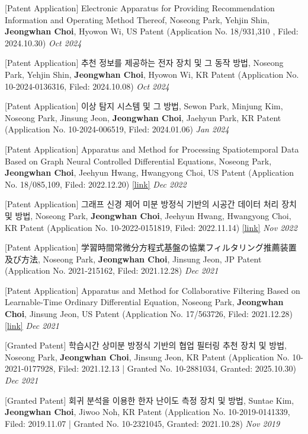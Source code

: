 \documentclass[10pt]{article}
\newenvironment{changemargin}[2]{
  \begin{list}{}{
    \setlength{\topsep}{0pt}
    \setlength{\leftmargin}{#1}
    \setlength{\rightmargin}{#2}
    \setlength{\listparindent}{\parindent}
    \setlength{\itemindent}{\parindent}
    \setlength{\parsep}{\parskip}
  }
  \item[]}{\end{list}
}
\newcommand{\presentation}[2]{
	{#1} \hfill \emph{#2}\\ \bigskip
}
\newenvironment{body} {
	\vspace*{-16pt}
	\begin{changemargin}{-0.25in}{-0.5in}
  }
	{\end{changemargin}
}
\begin{document}
\begin{body}
	\vspace{14pt}

\presentation{[Patent Application] Electronic Apparatus for Providing Recommendation Information and Operating Method Thereof, Noseong Park, Yehjin Shin, \textbf{Jeongwhan Choi}, Hyowon Wi, US Patent (Application No. 18/931,310 , Filed: 2024.10.30)}{Oct 2024}	
	
\presentation{[Patent Application] 추천 정보를 제공하는 전자 장치 및 그 동작 방법, Noseong Park, Yehjin Shin, \textbf{Jeongwhan Choi}, Hyowon Wi, KR Patent (Application No. 10-2024-0136316, Filed: 2024.10.08)}{Oct 2024}	


\presentation{[Patent Application] 이상 탐지 시스템 및 그 방법, Sewon Park, Minjung Kim, Noseong Park, Jinsung Jeon, \textbf{Jeongwhan Choi}, Jaehyun Park, KR Patent (Application No. 10-2024-006519, Filed: 2024.01.06) }{Jan 2024}

\presentation{[Patent Application] Apparatus and Method for Processing Spatiotemporal Data Based on Graph Neural Controlled Differential Equations, Noseong Park, \textbf{Jeongwhan Choi}, Jeehyun Hwang, Hwangyong Choi, US Patent (Application No. 18/085,109, Filed: 2022.12.20) \href{https://patents.google.com/patent/US20230186105A1/en}{[link]}}{Dec 2022}	

\presentation{[Patent Application] 그래프 신경 제어 미분 방정식 기반의 시공간 데이터 처리 장치 및 방법, Noseong Park, \textbf{Jeongwhan Choi}, Jeehyun Hwang, Hwangyong Choi, KR Patent (Application No. 10-2022-0151819, Filed: 2022.11.14) \href{https://patents.google.com/patent/KR20240073179A/en}{[link]}}{Nov 2022}

\presentation{[Patent Application] 学習時間常微分方程式基盤の協業フィルタリング推薦装置及び方法, Noseong Park, \textbf{Jeongwhan Choi}, Jinsung Jeon, JP Patent (Application No. 2021-215162, Filed: 2021.12.28)}{Dec 2021}	

\presentation{[Patent Application] Apparatus and Method for Collaborative Filtering Based on Learnable-Time Ordinary Differential Equation, Noseong Park, \textbf{Jeongwhan Choi}, Jinsung Jeon, US Patent (Application No. 17/563726, Filed: 2021.12.28) \href{https://patents.google.com/patent/US20230186105A1/en}{[link]}}{Dec 2021}	

\presentation{[Granted Patent] 학습시간 상미분 방정식 기반의 협업 필터링 추천 장치 및 방법, Noseong Park, \textbf{Jeongwhan Choi}, Jinsung Jeon, KR Patent (Application No. 10-2021-0177928, Filed: 2021.12.13 | Granted No. 10-2881034, Granted: 2025.10.30)}{Dec 2021}

\presentation{[Granted Patent] 회귀 분석을 이용한 한자 난이도 측정 장치 및 방법, Suntae Kim, \textbf{Jeongwhan Choi}, Jiwoo Noh, KR Patent (Application No. 10-2019-0141339, Filed: 2019.11.07 | Granted No. 10-2321045, Granted: 2021.10.28) }{Nov 2019}	
\end{body}
    
\end{document}
